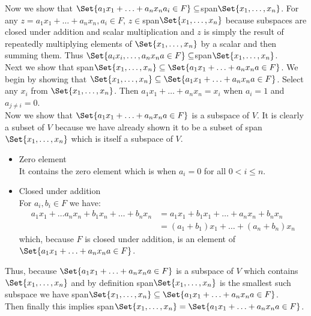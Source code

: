 \documentclass[paper=a4, fontsize=11pt]{jhwhw} %
\providecommand\given{} %
\begin{document}
Now we show that $\Set{a_{1}x_{1} + \ldots + a_nx_n \given a_i\in F} \subseteq $span$\Set{x_1, \ldots, x_n}$. 
For any $z = a_1x_1 + \ldots + a_nx_n, a_i\in F$, $z\in $span$\Set{x_1, \ldots, x_n}$ because subspaces are closed under addition and scalar multiplication and $z$ is simply the result of repeatedly multiplying elements of $\Set{x_1, \ldots, x_n}$ by a scalar and then summing them. Thus $\Set{a_ix_i, \ldots, a_nx_n\given a\in F} \subseteq $span$\Set{x_1, \ldots, x_n}$.\\

Next we show that span$\Set{x_1, \ldots, x_n}\subseteq \Set{a_1x_1 + \ldots + a_nx_n\given a\in F}$. We begin by showing that $\Set{x_1, \ldots, x_n} \subseteq \Set{a_1x_1 + \ldots + a_nx_n\given a\in F}$. Select any $x_i$ from $\Set{x_1, \ldots, x_n}$. Then $a_1x_1 + \ldots + a_nx_n = x_i$ when $a_i = 1$ and $a_{j\not=i} = 0$.\\

Now we show that $\Set{a_1x_1 + \ldots + a_nx_n\given a\in F}$ is a subspace of $V$. It is clearly a subset of $V$ because we have already shown it to be a subset of span$\Set{x_1, \ldots, x_n}$ which is itself a subspace of $V$. 
\begin{itemize}
    \item Zero element\\
        It contains the zero element which is when $a_i = 0$ for all $0<i\le n$. 
    \item Closed under addition\\
        For $a_i, b_i\in F$ we have:
        \begin{align}
            a_1x_1 + \ldots a_nx_n + b_1x_n + \ldots + b_nx_n &= a_1x_1 + b_1x_1 + \ldots + a_nx_n + b_nx_n\\
            &= (a_1 + b_1)x_1 + \ldots + (a_n + b_n)x_n
        \end{align}
        which, because $F$ is closed under addition, is an element of $\Set{a_1x_1 + \ldots + a_nx_n\given a\in F}$. 
\end{itemize}
Thus, because $\Set{a_1x_1 + \ldots + a_nx_n\given a\in F}$ is a subspace of $V$ which contains $\Set{x_1, \ldots, x_n}$ and by definition span$\Set{x_1, \ldots, x_n}$ is the smallest such subspace we have span$\Set{x_1, \ldots, x_n} \subseteq \Set{a_1x_1 + \ldots + a_nx_n\given a \in F}$.\\

Then finally this implies span$\Set{x_1, \ldots, x_n} = \Set{a_1x_1 + \ldots + a_nx_n\given a\in F}$.
\end{document}
